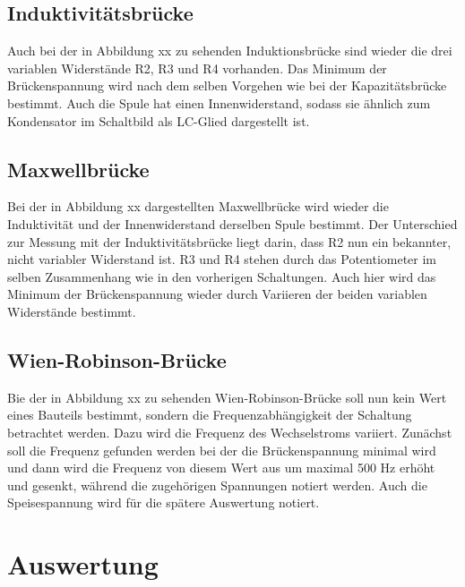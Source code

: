 \documentclass[titlepage = firstcover]{scrartcl}
\begin{document}
  \subsection{Induktivitätsbrücke}
  Auch bei der in Abbildung xx zu sehenden Induktionsbrücke sind wieder die drei variablen Widerstände R2, R3 und R4 vorhanden. Das Minimum der 
  Brückenspannung wird nach dem selben Vorgehen wie bei der Kapazitätsbrücke bestimmt. Auch die Spule hat einen Innenwiderstand, sodass sie ähnlich zum 
  Kondensator im Schaltbild als LC-Glied dargestellt ist. 

  \subsection{Maxwellbrücke}
  Bei der in Abbildung xx dargestellten Maxwellbrücke wird wieder die Induktivität und der Innenwiderstand derselben Spule bestimmt. Der Unterschied zur 
  Messung mit der Induktivitätsbrücke liegt darin, dass R2 nun ein bekannter, nicht variabler Widerstand ist. R3 und R4 stehen durch das Potentiometer
  im selben Zusammenhang wie in den vorherigen Schaltungen. Auch hier wird das Minimum der Brückenspannung wieder durch Variieren der beiden variablen 
  Widerstände bestimmt.

  \subsection{Wien-Robinson-Brücke}
  Bie der in Abbildung xx zu sehenden Wien-Robinson-Brücke soll nun kein Wert eines Bauteils bestimmt, sondern die Frequenzabhängigkeit der Schaltung
  betrachtet werden. Dazu wird die Frequenz des Wechselstroms variiert. Zunächst soll die Frequenz gefunden werden bei der die Brückenspannung minimal
  wird und dann wird die Frequenz von diesem Wert aus um maximal 500 Hz erhöht und gesenkt, während die zugehörigen Spannungen notiert werden. Auch die 
  Speisespannung wird für die spätere Auswertung notiert.


  \newpage


  \section{Auswertung}
\end{document}
